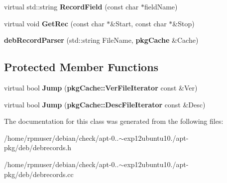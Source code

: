 \begin{DoxyCompactItemize}
\item 
virtual std\-::string {\bfseries \-Record\-Field} (const char $\ast$field\-Name)\label{classdebRecordParser_aae48fed9dc5cb814c2383bfe835cd4ba}

\item 
virtual void {\bfseries \-Get\-Rec} (const char $\ast$\&\-Start, const char $\ast$\&\-Stop)\label{classdebRecordParser_a2b57e844101624af8e50274ec51b7724}

\item 
{\bfseries deb\-Record\-Parser} (std\-::string \-File\-Name, {\bf pkg\-Cache} \&\-Cache)\label{classdebRecordParser_a3c085a73fe4f293c1a4f02b047234ccd}

\end{DoxyCompactItemize}
\subsection*{\-Protected \-Member \-Functions}
\begin{DoxyCompactItemize}
\item 
virtual bool {\bfseries \-Jump} ({\bf pkg\-Cache\-::\-Ver\-File\-Iterator} const \&\-Ver)\label{classdebRecordParser_aa4f9da5bb6ff9b716d556530ab0fe3d1}

\item 
virtual bool {\bfseries \-Jump} ({\bf pkg\-Cache\-::\-Desc\-File\-Iterator} const \&\-Desc)\label{classdebRecordParser_a88bc5a72e848c9056495222c609c7806}

\end{DoxyCompactItemize}


\-The documentation for this class was generated from the following files\-:\begin{DoxyCompactItemize}
\item 
/home/rpmuser/debian/check/apt-\/0..$\sim$exp12ubuntu10./apt-\/pkg/deb/debrecords.\-h\item 
/home/rpmuser/debian/check/apt-\/0..$\sim$exp12ubuntu10./apt-\/pkg/deb/debrecords.\-cc\end{DoxyCompactItemize}
